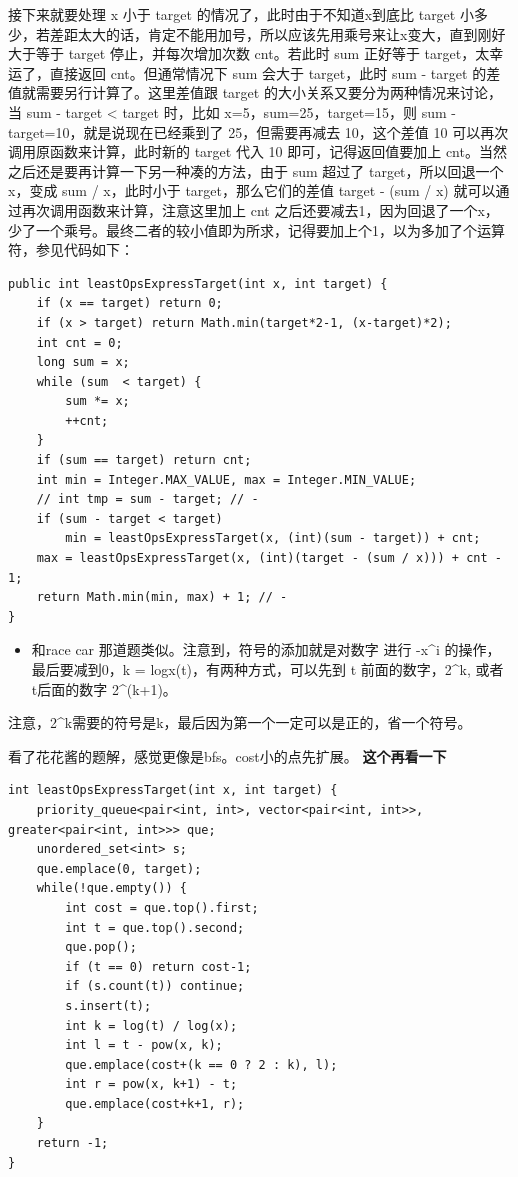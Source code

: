 \documentclass[9pt, b5paaper]{book}
\begin{document}
接下来就要处理 x 小于 target 的情况了，此时由于不知道x到底比 target 小多少，若差距太大的话，肯定不能用加号，所以应该先用乘号来让x变大，直到刚好大于等于 target 停止，并每次增加次数 cnt。若此时 sum 正好等于 target，太幸运了，直接返回 cnt。但通常情况下 sum 会大于 target，此时 sum - target 的差值就需要另行计算了。这里差值跟 target 的大小关系又要分为两种情况来讨论，当 sum - target < target 时，比如 x=5，sum=25，target=15，则 sum - target=10，就是说现在已经乘到了 25，但需要再减去 10，这个差值 10 可以再次调用原函数来计算，此时新的 target 代入 10 即可，记得返回值要加上 cnt。当然之后还是要再计算一下另一种凑的方法，由于 sum 超过了 target，所以回退一个x，变成 sum / x，此时小于 target，那么它们的差值 target - (sum / x) 就可以通过再次调用函数来计算，注意这里加上 cnt 之后还要减去1，因为回退了一个x，少了一个乘号。最终二者的较小值即为所求，记得要加上个1，以为多加了个运算符，参见代码如下：

\begin{verbatim}
public int leastOpsExpressTarget(int x, int target) {
    if (x == target) return 0;
    if (x > target) return Math.min(target*2-1, (x-target)*2);
    int cnt = 0;
    long sum = x;
    while (sum  < target) {
        sum *= x;
        ++cnt;
    }
    if (sum == target) return cnt;
    int min = Integer.MAX_VALUE, max = Integer.MIN_VALUE;
    // int tmp = sum - target; // -
    if (sum - target < target)
        min = leastOpsExpressTarget(x, (int)(sum - target)) + cnt;
    max = leastOpsExpressTarget(x, (int)(target - (sum / x))) + cnt - 1;
    return Math.min(min, max) + 1; // -
}
\end{verbatim}
\begin{itemize}
\item 和race car 那道题类似。注意到，符号的添加就是对数字 进行 -x\^{}i 的操作，最后要减到0，k = logx(t)，有两种方式，可以先到 t 前面的数字，2\^{}k, 或者 t后面的数字 2\^{}(k+1)。
\end{itemize}
注意，2\^{}k需要的符号是k，最后因为第一个一定可以是正的，省一个符号。

看了花花酱的题解，感觉更像是bfs。cost小的点先扩展。 \textbf{这个再看一下}

\begin{verbatim}
int leastOpsExpressTarget(int x, int target) {
    priority_queue<pair<int, int>, vector<pair<int, int>>, greater<pair<int, int>>> que;
    unordered_set<int> s;
    que.emplace(0, target);
    while(!que.empty()) {
        int cost = que.top().first;
        int t = que.top().second;
        que.pop();
        if (t == 0) return cost-1;
        if (s.count(t)) continue;
        s.insert(t);
        int k = log(t) / log(x);
        int l = t - pow(x, k);
        que.emplace(cost+(k == 0 ? 2 : k), l);
        int r = pow(x, k+1) - t;
        que.emplace(cost+k+1, r);
    }
    return -1;
}
\end{verbatim}
\end{document}
